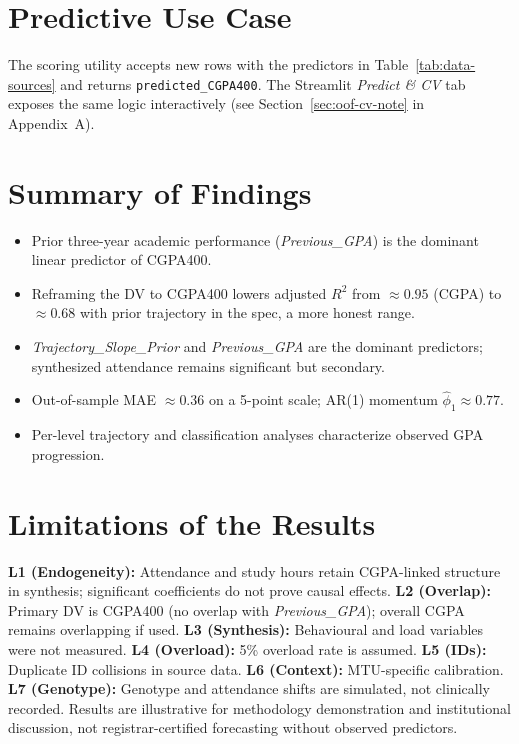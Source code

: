 \documentclass[12pt]{report}
\begin{document}
	\section{Predictive Use Case}
	The scoring utility accepts new rows with the predictors in Table~\ref{tab:data-sources} and returns \texttt{predicted\_CGPA400}. The Streamlit \emph{Predict \& CV} tab exposes the same logic interactively (see Section~\ref{sec:oof-cv-note} in Appendix~A).
	
	\section{Summary of Findings}
	\begin{itemize}
		\item Prior three-year academic performance (\textit{Previous\_GPA}) is the dominant linear predictor of CGPA400.
		\item Reframing the DV to CGPA400 lowers adjusted $R^2$ from $\approx 0.95$ (CGPA) to $\approx 0.68$ with prior trajectory in the spec, a more honest range.
		\item \textit{Trajectory\_Slope\_Prior} and \textit{Previous\_GPA} are the dominant predictors; synthesized attendance remains significant but secondary.
		\item Out-of-sample MAE $\approx 0.36$ on a 5-point scale; AR(1) momentum $\hat{\phi}_1 \approx 0.77$.
		\item Per-level trajectory and classification analyses characterize observed GPA progression.
	\end{itemize}
	
	\section{Limitations of the Results}
	\label{sec:limitations-results}
	\textbf{L1 (Endogeneity):} Attendance and study hours retain CGPA-linked structure in synthesis; significant coefficients do not prove causal effects. \textbf{L2 (Overlap):} Primary DV is CGPA400 (no overlap with \textit{Previous\_GPA}); overall CGPA remains overlapping if used. \textbf{L3 (Synthesis):} Behavioural and load variables were not measured. \textbf{L4 (Overload):} 5\% overload rate is assumed. \textbf{L5 (IDs):} Duplicate ID collisions in source data. \textbf{L6 (Context):} MTU-specific calibration. \textbf{L7 (Genotype):} Genotype and attendance shifts are simulated, not clinically recorded. Results are illustrative for methodology demonstration and institutional discussion, not registrar-certified forecasting without observed predictors.
	
\end{document}
